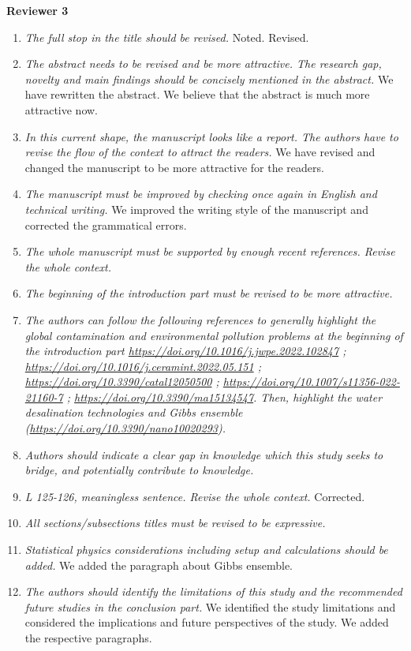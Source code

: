 \documentclass[12pt]{dinbrief}
\begin{document}
\textbf{Reviewer 3}

\textit{}
\begin{enumerate}
\item \textit{The full stop in the title should be revised.}
Noted. Revised.
\item \textit{The abstract needs to be revised and be more attractive. The research gap, novelty and main findings should be concisely mentioned in the abstract.}
We have rewritten the abstract. We believe that the abstract is much more attractive now.
\item \textit{In this current shape, the manuscript looks like a report. The authors have to revise the flow of the context to attract the readers.}
We have revised and changed the manuscript to be more attractive for the readers. 
\item \textit{The manuscript must be improved by checking once again in English and technical writing. }
We improved the writing style of the manuscript and corrected the grammatical errors.

\item \textit{The whole manuscript must be supported by enough recent references. Revise the whole context.}
\item \textit{The beginning of the introduction part must be revised to be more attractive.}
\item \textit{The authors can follow the following references to generally highlight the global contamination and environmental pollution problems at the beginning of the introduction part  \href{https://doi.org/10.1016/j.jwpe.2022.102847}{https://doi.org/10.1016/j.jwpe.2022.102847} ; \href{https://doi.org/10.1016/j.ceramint.2022.05.151}{https://doi.org/10.1016/j.ceramint.2022.05.151} ; 
\href{https://doi.org/10.3390/catal12050500}{https://doi.org/10.3390/catal12050500} ; 
\href{https://doi.org/10.1007/s11356-022-21160-7}{https://doi.org/10.1007/s11356-022-21160-7} ; 
\href{https://doi.org/10.3390/ma15134547}{https://doi.org/10.3390/ma15134547}. 
Then, highlight the water desalination technologies and Gibbs ensemble (\href{https://doi.org/10.3390/nano10020293}{https://doi.org/10.3390/nano10020293}).}
\item \textit{Authors should indicate a clear gap in knowledge which this study seeks to bridge, and potentially contribute to knowledge. }

\item \textit{L 125-126, meaningless sentence. Revise the whole context.}
Corrected.
\item \textit{All sections/subsections titles must be revised to be expressive.}
\item \textit{Statistical physics considerations including setup and calculations should be added.}
We added the paragraph about Gibbs ensemble.
\item \textit{The authors should identify the limitations of this study and the recommended future studies in the conclusion part.
}
We identified the study limitations and considered the implications and future perspectives of the study. We added the respective paragraphs.
\end{enumerate}








\end{document}
